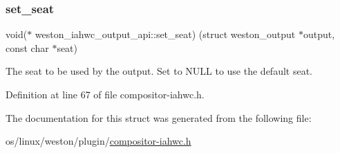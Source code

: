 \subsubsection{\texorpdfstring{set\+\_\+seat}{set\_seat}}
{\footnotesize\ttfamily void($\ast$ weston\+\_\+iahwc\+\_\+output\+\_\+api\+::set\+\_\+seat) (struct weston\+\_\+output $\ast$output, const char $\ast$seat)}

The seat to be used by the output. Set to N\+U\+LL to use the default seat. 

Definition at line 67 of file compositor-\/iahwc.\+h.



The documentation for this struct was generated from the following file\+:\begin{DoxyCompactItemize}
\item 
os/linux/weston/plugin/\mbox{\hyperlink{compositor-iahwc_8h}{compositor-\/iahwc.\+h}}\end{DoxyCompactItemize}
